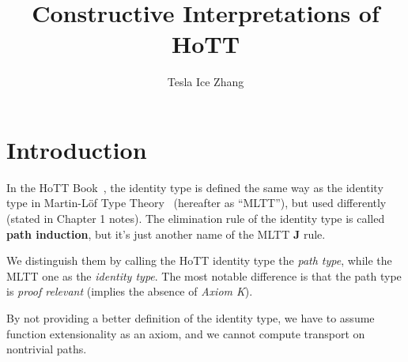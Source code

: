 \documentclass{article}
\title{Constructive Interpretations of HoTT}
\author{Tesla Ice Zhang}
\begin{document}
\maketitle

\tableofcontents

\section{Introduction}

In the HoTT Book~\cite{hottbook},
the identity type is defined the same way as the identity type
in Martin-L\"{o}f Type Theory~\cite{MLTT} (hereafter as ``MLTT''),
but used differently (stated in Chapter 1 notes).
The elimination rule of the identity type is called \textbf{path induction},
but it's just another name of the MLTT \textbf J rule.

We distinguish them by calling the HoTT identity type the \textit{path type},
while the MLTT one as the \textit{identity type}.
The most notable difference is that the path type is
\textit{proof relevant} (implies the absence of \textit{Axiom K}).

By not providing a better definition of the identity type,
we have to assume function extensionality as an axiom,
and we cannot compute transport on nontrivial paths.



\end{document}
